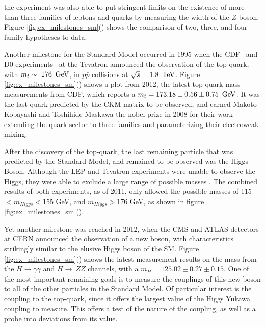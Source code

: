 \noindent the experiment was also able to put stringent limits on the
existence of more than three families of leptons and quarks by
measuring the width of the $Z$ boson.  Figure
\ref{fig:ex_milestones_sm}() shows the
comparison of two, three, and four family hypotheses to data.   

\par Another milestone for the Standard Model occurred in 1995 when the
CDF~\cite{ex:CDF_topQuark} and D0 experiments~\cite{ex:D0_topQuark} at
the Tevatron announced the observation of the top quark, with
$m_{t}\sim~176~\,\text{Ge\hspace{-.08em}V}$, in $p\bar{p}$ collisions at $\sqrt{s}=1.8~\,\text{Te\hspace{-.08em}V}$.
Figure \ref{fig:ex_milestones_sm}() shows a
plot from 2012, the latest top quark mass measurements from CDF, which
reports a $m_{t} = 173.18 \pm 0.56 \pm 0.75~\,\text{Ge\hspace{-.08em}V}$. It was the last
quark predicted by the CKM matrix to be observed, and earned Makoto
Kobayashi and Toshihide Maskawa the nobel prize in 2008 for their work
extending the quark sector to three families and parameterizing their
electroweak mixing.

\par After the discovery of the top-quark, the last remaining particle
that was predicted by the Standard Model, and remained to be observed
was the Higgs Boson.  Although the LEP and Tevatron experiments were
unable to observe the Higgs, they were able to exclude a large range
of possible masses \cite{CDFandD0:2011aa}.  The combined results of
both experiments, as of 2011, only allowed the possible masses of 115
$< m_{Higgs} <$155 GeV, and $m_{Higgs}>176$ GeV, as shown in figure
\ref{fig:ex_milestones_sm}().  

\par Yet another milestone was reached in 2012, when the CMS and ATLAS
detectors at CERN announced the observation of a new boson, with
characteristics strikingly similar to the elusive Higgs boson of the
SM.  Figure \ref{fig:ex_milestones_sm}() shows
the latest measurement results on the mass from the
$H\rightarrow\gamma\gamma$ and $H\rightarrow~ZZ$ channels, with a
$m_{H} = 125.02 \pm 0.27 \pm 0.15$.  One of the most important
remaining goals is to measure the couplings of this new boson to all
of the other particles in the Standard Model.  Of particular interest
is the coupling to the top-quark, since it offers the largest value of
the Higgs Yukawa coupling to measure.  This offers a test of the
nature of the coupling, as well as a probe into deviations from its
value.   


